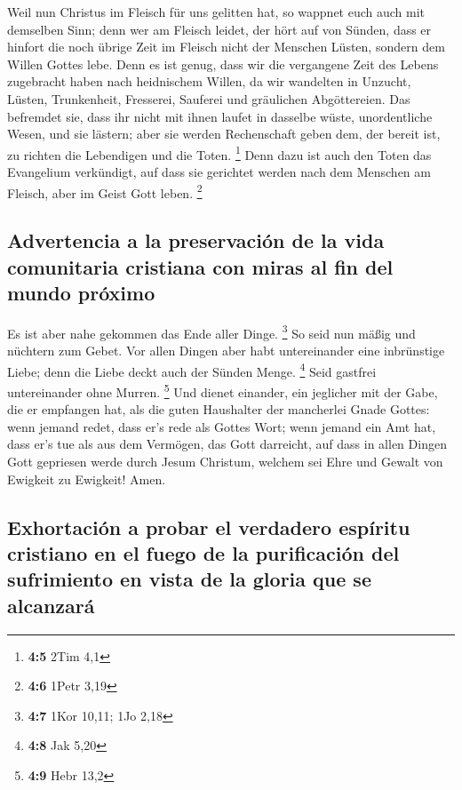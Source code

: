  Weil nun Christus im Fleisch für uns gelitten hat, so
wappnet euch auch mit demselben Sinn; denn wer am Fleisch leidet, der
hört auf von Sünden,  dass er hinfort die noch übrige Zeit
im Fleisch nicht der Menschen Lüsten, sondern dem Willen Gottes lebe.
 Denn es ist genug, dass wir die vergangene Zeit des
Lebens zugebracht haben nach heidnischem Willen, da wir wandelten in
Unzucht, Lüsten, Trunkenheit, Fresserei, Sauferei und gräulichen
Abgöttereien.  Das befremdet sie, dass ihr nicht mit ihnen
laufet in dasselbe wüste, unordentliche Wesen, und sie lästern;
 aber sie werden Rechenschaft geben dem, der bereit ist,
zu richten die Lebendigen und die Toten. \footnote{\textbf{4:5} 2Tim 4,1}
 Denn dazu ist auch den Toten das Evangelium verkündigt,
auf dass sie gerichtet werden nach dem Menschen am Fleisch, aber im
Geist Gott leben. \footnote{\textbf{4:6} 1Petr 3,19}

\hypertarget{advertencia-a-la-preservaciuxf3n-de-la-vida-comunitaria-cristiana-con-miras-al-fin-del-mundo-pruxf3ximo}{%
\subsection{Advertencia a la preservación de la vida comunitaria
cristiana con miras al fin del mundo
próximo}\label{advertencia-a-la-preservaciuxf3n-de-la-vida-comunitaria-cristiana-con-miras-al-fin-del-mundo-pruxf3ximo}}

 Es ist aber nahe gekommen das Ende aller Dinge.
\footnote{\textbf{4:7} 1Kor 10,11; 1Jo 2,18}  So seid nun
mäßig und nüchtern zum Gebet. Vor allen Dingen aber habt untereinander
eine inbrünstige Liebe; denn die Liebe deckt auch der Sünden Menge.
\footnote{\textbf{4:8} Jak 5,20}  Seid gastfrei
untereinander ohne Murren. \footnote{\textbf{4:9} Hebr 13,2}
 Und dienet einander, ein jeglicher mit der Gabe, die er
empfangen hat, als die guten Haushalter der mancherlei Gnade Gottes:
 wenn jemand redet, dass er's rede als Gottes Wort; wenn
jemand ein Amt hat, dass er's tue als aus dem Vermögen, das Gott
darreicht, auf dass in allen Dingen Gott gepriesen werde durch Jesum
Christum, welchem sei Ehre und Gewalt von Ewigkeit zu Ewigkeit! Amen.

\hypertarget{exhortaciuxf3n-a-probar-el-verdadero-espuxedritu-cristiano-en-el-fuego-de-la-purificaciuxf3n-del-sufrimiento-en-vista-de-la-gloria-que-se-alcanzaruxe1}{%
\subsection{Exhortación a probar el verdadero espíritu cristiano en el
fuego de la purificación del sufrimiento en vista de la gloria que se
alcanzará}\label{exhortaciuxf3n-a-probar-el-verdadero-espuxedritu-cristiano-en-el-fuego-de-la-purificaciuxf3n-del-sufrimiento-en-vista-de-la-gloria-que-se-alcanzaruxe1}}

